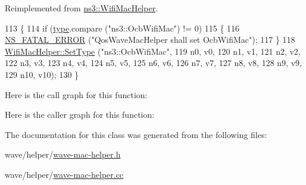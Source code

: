 Reimplemented from \hyperlink{classns3_1_1WifiMacHelper_a382d8df76a1dd7007179d1963b4b6bc6}{ns3\+::\+Wifi\+Mac\+Helper}.


\begin{DoxyCode}
113 \{
114   \textcolor{keywordflow}{if} (\hyperlink{visualizer-ideas_8txt_add98db9e15e2a58cf2b57623e7aa893a}{type}.compare (\textcolor{stringliteral}{"ns3::OcbWifiMac"}) != 0)
115     \{
116       \hyperlink{group__fatal_ga5131d5e3f75d7d4cbfd706ac456fdc85}{NS\_FATAL\_ERROR} (\textcolor{stringliteral}{"QosWaveMacHelper shall set OcbWifiMac"});
117     \}
118   \hyperlink{classns3_1_1WifiMacHelper_a382d8df76a1dd7007179d1963b4b6bc6}{WifiMacHelper::SetType} (\textcolor{stringliteral}{"ns3::OcbWifiMac"},
119                              n0, v0,
120                              n1, v1,
121                              n2, v2,
122                              n3, v3,
123                              n4, v4,
124                              n5, v5,
125                              n6, v6,
126                              n7, v7,
127                              n8, v8,
128                              n9, v9,
129                              n10, v10);
130 \}
\end{DoxyCode}


Here is the call graph for this function\+:




Here is the caller graph for this function\+:




The documentation for this class was generated from the following files\+:\begin{DoxyCompactItemize}
\item 
wave/helper/\hyperlink{wave-mac-helper_8h}{wave-\/mac-\/helper.\+h}\item 
wave/helper/\hyperlink{wave-mac-helper_8cc}{wave-\/mac-\/helper.\+cc}\end{DoxyCompactItemize}
